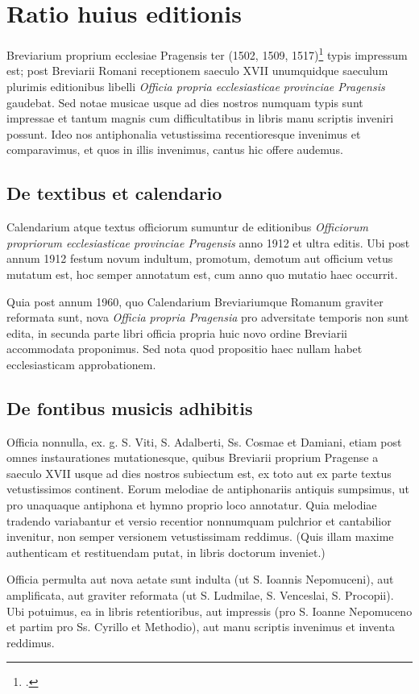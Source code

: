 \chapter*{Ratio huius editionis}

Breviarium proprium ecclesiae Pragensis ter
(1502, 1509, 1517)\footcite[242]{bohatta}
typis impressum est; post Breviarii Romani receptionem
saeculo XVII unumquidque saeculum plurimis editionibus
libelli \emph{Officia propria ecclesiasticae provinciae Pragensis} gaudebat.
Sed notae musicae usque ad dies nostros numquam typis sunt impressae
et tantum magnis cum difficultatibus in libris manu scriptis
inveniri possunt. Ideo nos antiphonalia vetustissima recentioresque
invenimus et comparavimus, et quos in illis invenimus,
cantus hic offere audemus.

\section*{De textibus et calendario}
Calendarium atque textus officiorum sumuntur de editionibus
\emph{Officiorum propriorum ecclesiasticae provinciae Pragensis}
anno 1912 et ultra editis.
Ubi post annum 1912 festum novum indultum, promotum, demotum
aut officium vetus mutatum est, hoc semper annotatum est,
cum anno quo mutatio haec occurrit.

Quia post annum 1960, quo Calendarium Breviariumque Romanum
graviter reformata sunt, nova \emph{Officia propria Pragensia}
pro adversitate temporis non sunt edita,
in secunda parte libri officia propria huic novo ordine Breviarii
accommodata proponimus. Sed nota quod propositio haec nullam habet
ecclesiasticam approbationem.

\section*{De fontibus musicis adhibitis}
Officia nonnulla, ex. g. S. Viti, S. Adalberti, Ss. Cosmae et Damiani,
etiam post omnes instaurationes mutationesque, quibus
Breviarii proprium Pragense a saeculo XVII usque ad dies nostros
subiectum est, ex toto aut ex parte textus vetustissimos
continent.
Eorum melodiae de antiphonariis antiquis sumpsimus,
ut pro unaquaque antiphona et hymno proprio loco annotatur.
Quia melodiae tradendo variabantur et versio recentior nonnumquam
pulchrior et cantabilior invenitur, non semper versionem
vetustissimam reddimus.
(Quis illam maxime authenticam et restituendam putat,
in libris doctorum inveniet.)

Officia permulta aut nova aetate sunt indulta
(ut S. Ioannis Nepomuceni),
aut amplificata,
aut graviter reformata (ut S. Ludmilae, S. Venceslai, S. Procopii).
Ubi potuimus, ea in libris retentioribus, aut impressis
(pro S. Ioanne Nepomuceno et partim pro Ss. Cyrillo et Methodio),
aut manu scriptis invenimus et inventa reddimus.

